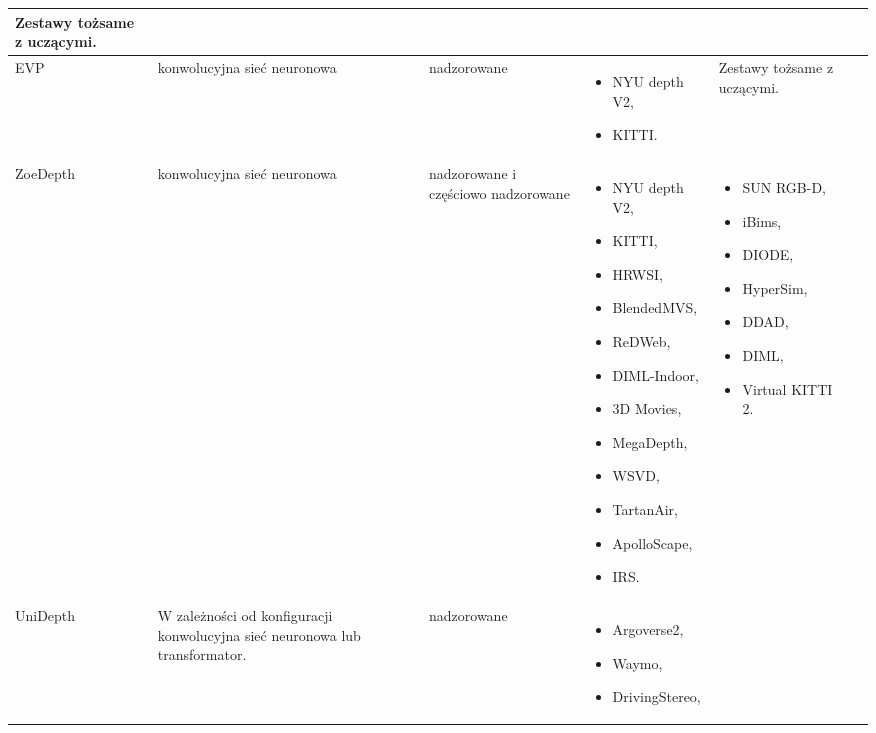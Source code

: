 \begin{table}[H]
{\begin{tabular}{ |l|p{2cm}|p{2cm}|p{5cm}|p{5cm}|r| }
        Zestawy tożsame z uczącymi.\\
        \hline
        EVP &
        konwolucyjna sieć neuronowa &
        nadzorowane &
        \begin{itemize} 
            \item NYU depth V2,
            \item KITTI.
        \end{itemize} & 
        Zestawy tożsame z uczącymi.\\
        \hline
        ZoeDepth &
        konwolucyjna sieć neuronowa &
        nadzorowane i częściowo nadzorowane &
        \begin{itemize} 
            \item NYU depth V2,
            \item KITTI,
            \item HRWSI,
            \item BlendedMVS,
            \item ReDWeb,
            \item DIML-Indoor,
            \item 3D Movies,
            \item MegaDepth,
            \item WSVD,
            \item TartanAir,
            \item ApolloScape,
            \item IRS.
        \end{itemize} & 
        \begin{itemize} 
            \item SUN RGB-D,
            \item iBims,
            \item DIODE,
            \item HyperSim,
            \item DDAD,
            \item DIML,
            \item Virtual KITTI 2.
        \end{itemize}\\
        \hline
        UniDepth &
        W zależności od konfiguracji konwolucyjna sieć neuronowa lub transformator. &
        nadzorowane &
        \begin{itemize}
        \item Argoverse2,
        \item Waymo,
        \item DrivingStereo,

\end{itemize}
\end{tabular}}
\end{table}

